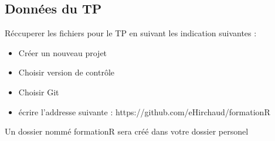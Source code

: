 \subsection{Données du TP}
Réccuperer les fichiers pour le TP en suivant les indication suivantes :
\begin{itemize}
	\item Créer un nouveau projet
	\item Choisir version de contrôle
	\item Choisir Git
	\item écrire l'addresse suivante :  https://github.com/eHirchaud/formationR
\end{itemize}

Un dossier nommé formationR sera créé dans votre dossier personel


